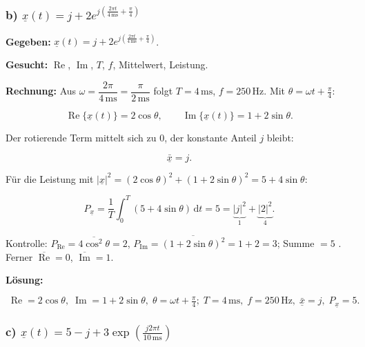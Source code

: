 \subsubsection*{b) $\underline{x}(t) = j + 2e^{j\left(\frac{2\pi t}{4\,\mathrm{ms}} + \frac{\pi}{4}\right)}$}

\begin{beispiel}

\textbf{Gegeben:}
$\underline{x}(t) = j + 2e^{j\left(\frac{2\pi t}{4\,\mathrm{ms}}
+ \frac{\pi}{4}\right)}$.

\textbf{Gesucht:} $\operatorname{Re}$, $\operatorname{Im}$, $T$, $f$,
Mittelwert, Leistung.

\textbf{Rechnung:} Aus $\omega = \dfrac{2\pi}{4\,\mathrm{ms}}
= \dfrac{\pi}{2\,\mathrm{ms}}$ folgt $T = 4\,\mathrm{ms}$, $f = 250\,\mathrm{Hz}$.
Mit $\theta = \omega t + \tfrac{\pi}{4}$:

$$
\operatorname{Re}\{\underline{x}(t)\} = 2\cos\theta,
\qquad
\operatorname{Im}\{\underline{x}(t)\} = 1 + 2\sin\theta.
$$

Der rotierende Term mittelt sich zu $0$, der konstante Anteil $j$ bleibt:

$$
\bar{\underline{x}} = j.
$$

Für die Leistung mit $|\underline{x}|^2 = (2\cos\theta)^2
+ (1 + 2\sin\theta)^2 = 5 + 4\sin\theta$:

$$
P_{\underline{x}} = \frac{1}{T}\int_0^T (5 + 4\sin\theta)\,\mathrm{d}t = 5
= \underbrace{|j|^2}_{1} + \underbrace{|2|^2}_{4}.
$$

Kontrolle: $P_{\operatorname{Re}} = \overline{4\cos^2\theta} = 2$,
$P_{\operatorname{Im}} = \overline{(1 + 2\sin\theta)^2} = 1 + 2 = 3$; Summe
$= 5$ \checkmark. Ferner $\overline{\operatorname{Re}} = 0$,
$\overline{\operatorname{Im}} = 1$.

\textbf{Lösung:}

$$
\boxed{\;\operatorname{Re} = 2\cos\theta,\;
\operatorname{Im} = 1 + 2\sin\theta,\;\theta = \omega t + \tfrac{\pi}{4};\;
T = 4\,\mathrm{ms},\; f = 250\,\mathrm{Hz},\;
\bar{\underline{x}} = j,\; P_{\underline{x}} = 5.\;}
$$

\end{beispiel}

\subsubsection*{c) $\underline{x}(t) = 5 - j + 3\exp\!\left(\frac{j2\pi t}{10\,\mathrm{ms}}\right)$}

